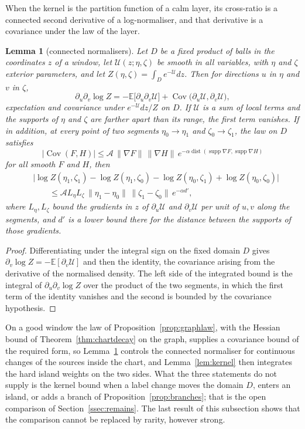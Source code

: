 \documentclass[11pt]{amsart}
\newtheorem{lemma}[theorem]{Lemma}
\theoremstyle{definition}
\theoremstyle{remark}
\numberwithin{equation}{section}
\newcommand{\E}{\mathbb{E}}
\newcommand{\Cov}{\operatorname{Cov}}
\newcommand{\dist}{\operatorname{dist}}
\begin{document}
When the kernel is the partition function of a calm layer, its cross-ratio
is a connected second derivative of a log-normaliser, and that derivative
is a covariance under the law of the layer.

\begin{lemma}[connected normalisers]\label{lem:connected}
Let $D$ be a fixed product of balls in the coordinates $z$ of a window, let
$\mathcal U(z;\eta,\zeta)$ be smooth in all variables, with $\eta$ and
$\zeta$ exterior parameters, and let $Z(\eta,\zeta)=\int_De^{-\mathcal U}
dz$. Then for directions $u$ in $\eta$ and $v$ in $\zeta$,
\[
\partial_u\partial_v\log Z=-\E\bigl[\partial_u\partial_v\mathcal U\bigr]+
\Cov\bigl(\partial_u\mathcal U,\partial_v\mathcal U\bigr),
\]
expectation and covariance under $e^{-\mathcal U}dz/Z$ on $D$. If
$\mathcal U$ is a sum of local terms and the supports of $\eta$ and
$\zeta$ are farther apart than its range, the first term vanishes. If in
addition, at every point of two segments $\eta_0\to\eta_1$ and
$\zeta_0\to\zeta_1$, the law on $D$ satisfies
\[
|\Cov(F,H)|\le\mathcal A\,\lVert\nabla F\rVert\,\lVert\nabla H\rVert\,
e^{-\alpha\dist(\operatorname{supp}\nabla F,\operatorname{supp}\nabla H)}
\]
for all smooth $F$ and $H$, then
\[
\begin{split}
&\bigl|\log Z(\eta_1,\zeta_1)-\log Z(\eta_1,\zeta_0)-\log Z(\eta_0,\zeta_1)
+\log Z(\eta_0,\zeta_0)\bigr|\\
&\qquad\le\mathcal AL_\eta L_\zeta\,
\lVert\eta_1-\eta_0\rVert\,\lVert\zeta_1-\zeta_0\rVert\,e^{-\alpha d'},
\end{split}
\]
where $L_\eta,L_\zeta$ bound the gradients in $z$ of $\partial_u\mathcal U$
and $\partial_v\mathcal U$ per unit of $u,v$ along the segments, and $d'$
is a lower bound there for the distance between the supports of those
gradients.
\end{lemma}

\begin{proof}
Differentiating under the integral sign on the fixed domain $D$ gives
$\partial_v\log Z=-\E[\partial_v\mathcal U]$ and then the identity, the
covariance arising from the derivative of the normalised density. The
left side of the integrated bound is the integral of $\partial_u\partial_v
\log Z$ over the product of the two segments, in which the first term of
the identity vanishes and the second is bounded by the covariance
hypothesis.
\end{proof}

On a good window the law of Proposition~\ref{prop:graphlaw}, with the
Hessian bound of Theorem~\ref{thm:chartdecay} on the graph, supplies a
covariance bound of the required form, so Lemma~\ref{lem:connected}
controls the connected normaliser for continuous changes of the sources
inside the chart, and Lemma~\ref{lem:kernel} then integrates the hard
island weights on the two sides. What the three statements do not supply
is the kernel bound when a label change moves the domain $D$, enters an
island, or adds a branch of Proposition~\ref{prop:branches}; that is the
open comparison of Section~\ref{ssec:remains}. The last result of this
subsection shows that the comparison cannot be replaced by rarity, however
strong.
\end{document}
